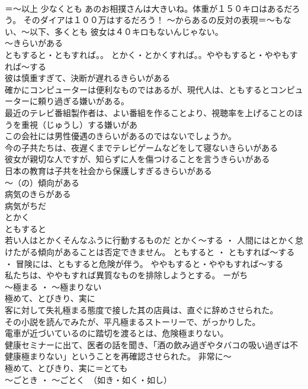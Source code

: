 \documentclass[8pt]{extreport}
\begin{document}
\begin{CJK}{UTF8}{min}
\\	＝～以上 少なくとも あのお相撲さんは大きいね。体重が１５０キロはあるだろう。 そのダイアは１００万はするだろう！ ～からあるの反対の表現＝～もない、～以下、多くとも 彼女は４０キロもないんじゃない。
\\	～きらいがある 
\\	ともすると・ともすれば。。 とかく・とかくすれば。。ややもすると・ややもすれば～する 
\\	彼は慎重すぎて、決断が遅れるきらいがある 
\\	確かにコンピューターは便利なものではあるが、現代人は、ともするとコンピューターに頼り過ぎる嫌いがある。 
\\	最近のテレビ番組製作者は、よい番組を作ることより、視聴率を上げることのほうを重視（じゅうし）する嫌いがあ 
\\	この会社には男性優遇のきらいがあるのではないでしょうか。
\\	今の子共たちは、夜遅くまでテレビゲームなどをして寝ないきらいがある 
\\	彼女が親切な人ですが、知らずに人を傷つけることを言うきらいがある 
\\	日本の教育は子共を社会から保護しすぎるきらいがある 
\\	～（の）傾向がある 
\\	病気のきらがある 
\\	病気がちだ 
\\	とかく
\\	ともすると
\\	若い人はとかくそんなふうに行動するものだ	とかく～する ・ 人間にはとかく怠けたがる傾向があることは否定できません。 ともすると ・ ともすれば～する ・ 冒険には、ともすると危険が伴う。 ややもすると・ややもすれば～する 
\\	私たちは、ややもすれば異質なものを排除しようとする。 ーがち 
\\	～極まる ・ ～極まりない 
\\	極めて、とびきり、実に	
\\	客に対して失礼極まる態度で接した其の店員は、直ぐに辞めさせられた。 
\\	その小説を読んでみたが、平凡極まるストーリーで、がっかりした。 
\\	電車が近づいているのに踏切を渡るとは、危険極まりない。 
\\	健康セミナーに出て、医者の話を聞き、「酒の飲み過ぎやタバコの吸い過ぎは不健康極まりない」ということを再確認させられた。	非常に～ 
\\	極めて、とびきり、実に＝とても 
\\	～ごとき ・ ～ごとく　（如き・如く・如し）	

\end{CJK}
\end{document}
